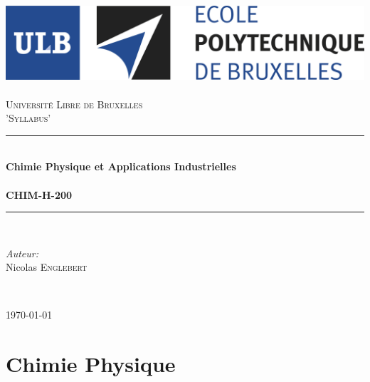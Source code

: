 \documentclass[11pt, a4paper, openany]{book}
\begin{document}
\renewcommand{\proofname}{Démonstration}
\frontmatter
\begin{titlepage}
\begin{center}	
	
	\newcommand{\HRule}{\rule{\linewidth}{0.5mm}}   			%
	\includegraphics[scale=0.11]{logo.jpg}~\\[1cm]				%

	\textsc{\LARGE Université Libre de Bruxelles}\\[1.5cm]
	\textsc{\Large 'Syllabus'}\\[0.5cm]

	\HRule \\[0.4cm]
	{ \huge \bfseries Chimie Physique et Applications Industrielles \\ \ \\ CHIM-H-200 \\[0.4cm] }


	\HRule \\[1.5cm]
		\begin{minipage}{0.4\textwidth}
		\begin{flushleft} \large
		
		\emph{Auteur:}\\
			Nicolas \textsc{Englebert}\\
			\end{flushleft}
			\end{minipage}
			\begin{minipage}{0.4\textwidth}
			\begin{flushright} \large
			\emph{} \\		
			\textsc{}
			\end{flushright}
		\end{minipage}

	\vfill

{\large \today}

\end{center}
\end{titlepage}



\tableofcontents
\mainmatter
\part{Chimie Physique}
\end{document}
